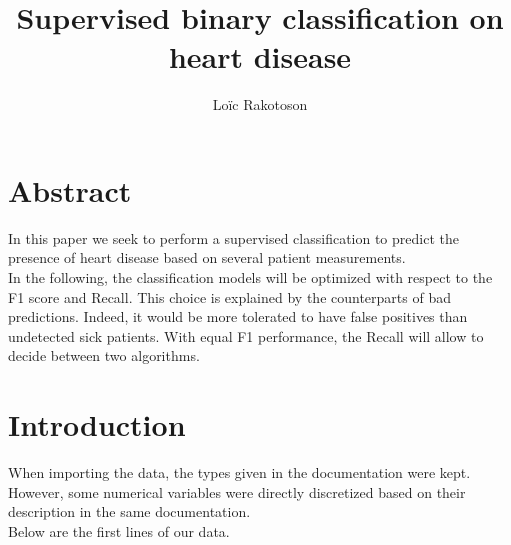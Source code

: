 \documentclass[
]{article}
\title{Supervised binary classification on heart disease}
\author{Loïc Rakotoson}
\date{}
\begin{document}
\maketitle

\hypertarget{abstract}{%
\section{Abstract}\label{abstract}}

In this paper we seek to perform a supervised classification to predict
the presence of heart disease based on several patient measurements.\\
In the following, the classification models will be optimized with
respect to the F1 score and Recall. This choice is explained by the
counterparts of bad predictions. Indeed, it would be more tolerated to
have false positives than undetected sick patients. With equal F1
performance, the Recall will allow to decide between two algorithms.

\hypertarget{introduction}{%
\section{Introduction}\label{introduction}}

When importing the data, the types given in the documentation were kept.
However, some numerical variables were directly discretized based on
their description in the same documentation.\\
Below are the first lines of our data.
\end{document}

